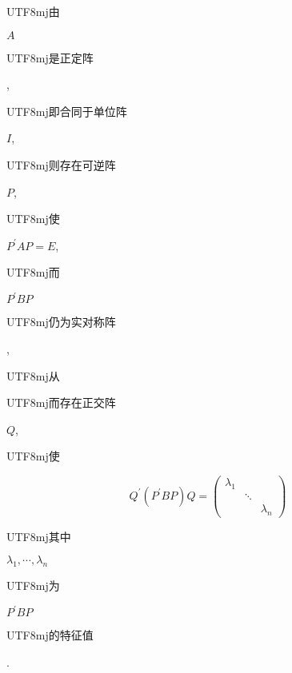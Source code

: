 \documentclass[10pt]{article}
\begin{document}
\begin{CJK}{UTF8}{mj}由\end{CJK} $A$ \begin{CJK}{UTF8}{mj}是正定阵\end{CJK}, \begin{CJK}{UTF8}{mj}即合同于单位阵\end{CJK} $I$, \begin{CJK}{UTF8}{mj}则存在可逆阵\end{CJK} $P$, \begin{CJK}{UTF8}{mj}使\end{CJK} $P^{\prime} A P=E$, \begin{CJK}{UTF8}{mj}而\end{CJK} $P^{\prime} B P$ \begin{CJK}{UTF8}{mj}仍为实对称阵\end{CJK}, \begin{CJK}{UTF8}{mj}从\end{CJK} \begin{CJK}{UTF8}{mj}而存在正交阵\end{CJK} $Q$, \begin{CJK}{UTF8}{mj}使\end{CJK}
$$
Q^{\prime}\left(P^{\prime} B P\right) Q=\left(\begin{array}{lll}
\lambda_{1} & & \\
& \ddots & \\
& & \lambda_{n}
\end{array}\right)
$$
\begin{CJK}{UTF8}{mj}其中\end{CJK} $\lambda_{1}, \cdots, \lambda_{n}$ \begin{CJK}{UTF8}{mj}为\end{CJK} $P^{\prime} B P$ \begin{CJK}{UTF8}{mj}的特征值\end{CJK}.
\end{document}
